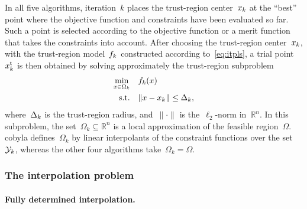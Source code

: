 \documentclass[
    smallextended,  %
    final,        %
]{svjour3}
\newcommand{\R}{\mathbb{R}}
\newcommand{\fsetm}[1][k]{\Omega_{#1}}
\newcommand{\fset}{\Omega}
\newcommand{\iter}[1][k]{x\ifthenelse{\equal{#1}{}}{}{_{#1}}}
\newcommand{\norm}[2][]{#1\lVert#2#1\rVert}
\newcommand{\objm}[1][k]{\obj\ifthenelse{\equal{#1}{}}{}{_{#1}}}
\newcommand{\obj}{f}
\newcommand{\rad}[1][k]{\Delta\ifthenelse{\equal{#1}{}}{}{_{#1}}}
\newcommand{\st}{\text{s.t.}}
\newcommand{\trust}{{\text{t}}}
\newcommand{\xpt}[1][k]{\mathcal{Y}\ifthenelse{\equal{#1}{}}{}{_{#1}}}
\begin{document}
In all five algorithms, iteration~$k$ places the trust-region center~$\iter$ at the ``best'' point where the objective function and constraints have been evaluated so far.
Such a point is selected according to the objective function or a merit function that takes the constraints into account.
After choosing the trust-region center~$\iter$, with the trust-region model~$\objm$ constructed
according to~\eqref{eq:itpls}, a trial point~$\iter^{\trust}$ is then obtained by solving approximately the trust-region subproblem
\begin{equation}
    \label{eq:trsp}
    \begin{split}
        \min_{x \in \fsetm} & \quad \objm(x)\\
        \st                 & \quad \norm{x - \iter} \le \rad,
    \end{split}
\end{equation}
where~$\rad$ is the trust-region radius, and~$\norm{\cdot}$ is the~$\ell_2$-norm in~$\R^n$.
In this subproblem, the set~$\fsetm \subseteq \R^n$ is a local approximation of the feasible region~$\fset$.
\Gls{cobyla} defines~$\fsetm$ by linear interpolants of the constraint functions over the set~$\xpt$,
whereas the other four algorithms take~$\fsetm = \fset$.


\subsubsection{The interpolation problem}
\label{ssec:iptprob}

\paragraph{\textnormal{\textbf{Fully determined interpolation.}}}
\end{document}
